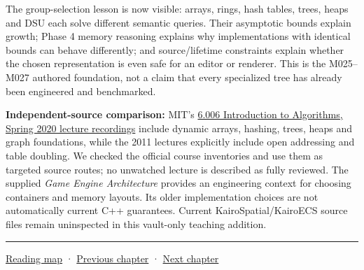 The group-selection lesson is now visible: arrays, rings, hash tables, trees, heaps and DSU each solve different semantic queries. Their asymptotic bounds explain growth; Phase 4 memory reasoning explains why implementations with identical bounds can behave differently; and source/lifetime constraints explain whether the chosen representation is even safe for an editor or renderer. This is the M025--M027 authored foundation, not a claim that every specialized tree has already been engineered and benchmarked.

\textbf{Independent-source comparison:} MIT's \href{https://ocw.mit.edu/courses/6-006-introduction-to-algorithms-spring-2020/video_galleries/lecture-videos/}{6.006 Introduction to Algorithms, Spring 2020 lecture recordings} include dynamic arrays, hashing, trees, heaps and graph foundations, while the 2011 lectures explicitly include open addressing and table doubling. We checked the official course inventories and use them as targeted source routes; no unwatched lecture is described as fully reviewed. The supplied \emph{Game Engine Architecture} provides an engineering context for choosing containers and memory layouts. Its older implementation choices are not automatically current C++ guarantees. Current KairoSpatial/KairoECS source files remain uninspected in this vault-only teaching addition.

\begin{center}\rule{0.5\linewidth}{0.5pt}\end{center}

\href{Chapter\%20Edition/01\%20-\%20Computing\%20Foundations/00\%20-\%20Reading\%20Map}{Reading map} · \hyperref[01-foundations-i-ch006]{Previous chapter} · \hyperref[01-foundations-i-ch008]{Next chapter}
